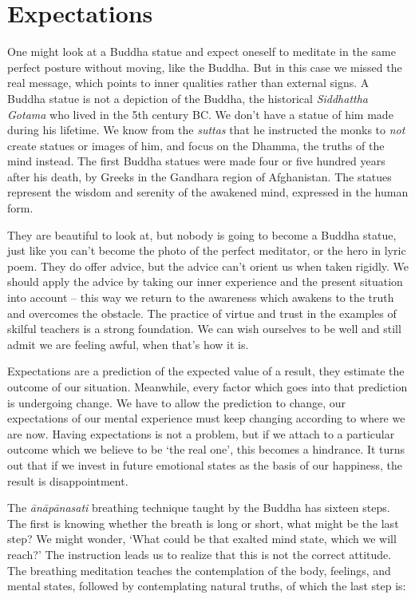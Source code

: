 \section{Expectations}


One might look at a Buddha statue and expect oneself to meditate in the
same perfect posture without moving, like the Buddha. But in this case
we missed the real message, which points to inner qualities rather than
external signs. A Buddha statue is not a depiction of the Buddha, the
historical \emph{Siddhattha Gotama} who lived in the 5th century BC. We
don't have a statue of him made during his lifetime. We know from the
\emph{suttas} that he instructed the monks to \emph{not} create statues
or images of him, and focus on the Dhamma, the truths of the mind
instead. The first Buddha statues were made four or five hundred years
after his death, by Greeks in the Gandhara region of Afghanistan. The
statues represent the wisdom and serenity of the awakened mind,
expressed in the human form.

They are beautiful to look at, but nobody is going to become a Buddha
statue, just like you can't become the photo of the perfect meditator,
or the hero in lyric poem. They do offer advice, but the advice can't
orient us when taken rigidly. We should apply the advice by taking our
inner experience and the present situation into account -- this way we
return to the awareness which awakens to the truth and overcomes the
obstacle. The practice of virtue and trust in the examples of skilful
teachers is a strong foundation. We can wish ourselves to be well and
still admit we are feeling awful, when that's how it is.

Expectations are a prediction of the expected value of a result, they
estimate the outcome of our situation. Meanwhile, every factor which
goes into that prediction is undergoing change. We have to allow the
prediction to change, our expectations of our mental experience must
keep changing according to where we are now. Having expectations is not
a problem, but if we attach to a particular outcome which we believe to
be `the real one', this becomes a hindrance. It turns out that if we
invest in future emotional states as the basis of our happiness, the
result is disappointment.

The \emph{ānāpānasati} breathing technique taught by the Buddha has
sixteen steps. The first is knowing whether the breath is long or short,
what might be the last step? We might wonder, `What could be that
exalted mind state, which we will reach?' The instruction leads us to
realize that this is not the correct attitude. The breathing meditation
teaches the contemplation of the body, feelings, and mental states,
followed by contemplating natural truths, of which the last step is:

